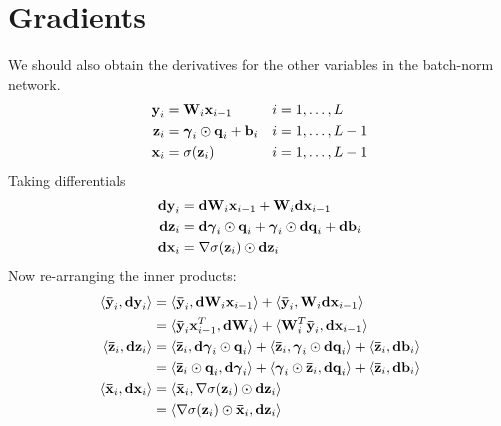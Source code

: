 \section{Gradients}

We should also obtain the derivatives for the other variables in the batch-norm network.
\begin{align}
\obj{y}_{i} & = \obj{W}_{i} \obj{x}_{i - 1} && i = 1, \dots, L \\
\obj{z}_{i} & = \obj{\gamma}_{i} \odot \obj{q}_{i} + \obj{b}_{i} && i = 1, \dots, L - 1 \\
\obj{x}_{i} & = \sigma(\obj{z}_{i}) && i = 1, \dots, L - 1
\end{align}
Taking differentials
\begin{align}
\obj{dy}_{i} & = \obj{dW}_{i} \obj{x}_{i - 1} + \obj{W}_{i} \obj{dx}_{i - 1} \\
\obj{dz}_{i} & = \obj{d\gamma}_{i} \odot \obj{q}_{i} + \obj{\gamma}_{i} \odot \obj{dq}_{i} + \obj{db}_{i} \\
\obj{dx}_{i} & = \nabla\sigma(\obj{z}_{i}) \odot \obj{dz}_{i}
\end{align}
Now re-arranging the inner products:
\begin{align}
\langle \gradobj{y}_{i}, \obj{dy}_{i}\rangle
& = \langle \gradobj{y}_{i}, \obj{dW}_{i} \obj{x}_{i - 1} \rangle + \langle \gradobj{y}_{i}, \obj{W}_{i} \obj{dx}_{i - 1} \rangle \\
& = \langle \gradobj{y}_{i} \obj{x}_{i - 1}^T, \obj{dW}_{i} \rangle + \langle \obj{W}_{i}^{T} \gradobj{y}_{i}, \obj{dx}_{i - 1} \rangle \\
\langle \gradobj{z}_{i}, \obj{dz}_{i} \rangle
& = \langle \gradobj{z}_{i}, \obj{d\gamma}_{i} \odot \obj{q}_{i} \rangle + \langle \gradobj{z}_{i}, \obj{\gamma}_{i} \odot \obj{dq}_{i} \rangle + \langle \gradobj{z}_{i}, \obj{db}_{i} \rangle \\
& = \langle \gradobj{z}_{i} \odot \obj{q}_{i}, \obj{d\gamma}_{i} \rangle + \langle \obj{\gamma}_{i} \odot \gradobj{z}_{i}, \obj{dq}_{i} \rangle + \langle \gradobj{z}_{i}, \obj{db}_{i} \rangle \\
\langle \gradobj{x}_{i}, \obj{dx}_{i} \rangle
& = \langle \gradobj{x}_{i}, \nabla\sigma(\obj{z}_{i}) \odot \obj{dz}_{i} \rangle \\
& = \langle \nabla\sigma(\obj{z}_{i}) \odot \gradobj{x}_{i}, \obj{dz}_{i} \rangle
\end{align}

